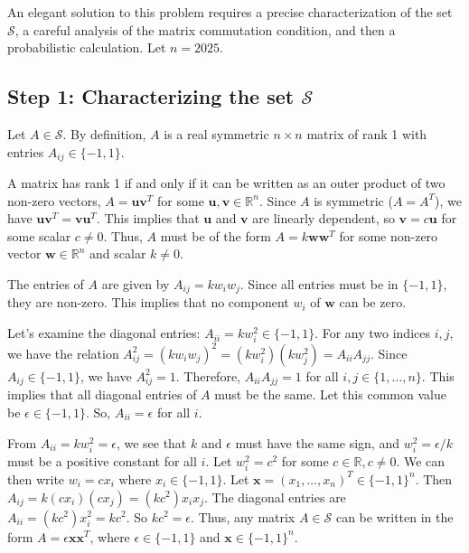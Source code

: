 \documentclass[12pt,a4paper]{article}
\theoremstyle{definition}
\begin{document}
        An elegant solution to this problem requires a precise characterization of the set $\mathcal{S}$, a careful analysis of the matrix commutation condition, and then a probabilistic calculation. Let $n = 2025$.

        \subsection*{Step 1: Characterizing the set $\mathcal{S}$}

        Let $A \in \mathcal{S}$. By definition, $A$ is a real symmetric $n \times n$ matrix of rank 1 with entries $A_{ij} \in \{-1, 1\}$.

        A matrix has rank 1 if and only if it can be written as an outer product of two non-zero vectors, $A = \mathbf{u}\mathbf{v}^T$ for some $\mathbf{u}, \mathbf{v} \in \mathbb{R}^n$. Since $A$ is symmetric ($A=A^T$), we have $\mathbf{u}\mathbf{v}^T = \mathbf{v}\mathbf{u}^T$. This implies that $\mathbf{u}$ and $\mathbf{v}$ are linearly dependent, so $\mathbf{v} = c\mathbf{u}$ for some scalar $c \neq 0$. Thus, $A$ must be of the form $A = k \mathbf{w}\mathbf{w}^T$ for some non-zero vector $\mathbf{w} \in \mathbb{R}^n$ and scalar $k \neq 0$.

        The entries of $A$ are given by $A_{ij} = k w_i w_j$. Since all entries must be in $\{-1, 1\}$, they are non-zero. This implies that no component $w_i$ of $\mathbf{w}$ can be zero.

        Let's examine the diagonal entries: $A_{ii} = k w_i^2 \in \{-1, 1\}$.
        For any two indices $i, j$, we have the relation $A_{ij}^2 = (k w_i w_j)^2 = (k w_i^2)(k w_j^2) = A_{ii} A_{jj}$.
        Since $A_{ij} \in \{-1, 1\}$, we have $A_{ij}^2 = 1$. Therefore, $A_{ii} A_{jj} = 1$ for all $i, j \in \{1, \dots, n\}$.
        This implies that all diagonal entries of $A$ must be the same. Let this common value be $\epsilon \in \{-1, 1\}$. So, $A_{ii} = \epsilon$ for all $i$.

        From $A_{ii} = k w_i^2 = \epsilon$, we see that $k$ and $\epsilon$ must have the same sign, and $w_i^2 = \epsilon/k$ must be a positive constant for all $i$. Let $w_i^2 = c^2$ for some $c \in \mathbb{R}, c \neq 0$. We can then write $w_i = c x_i$ where $x_i \in \{-1, 1\}$. Let $\mathbf{x} = (x_1, \dots, x_n)^T \in \{-1, 1\}^n$.
        Then $A_{ij} = k (c x_i)(c x_j) = (k c^2) x_i x_j$.
        The diagonal entries are $A_{ii} = (k c^2) x_i^2 = k c^2$. So $k c^2 = \epsilon$.
        Thus, any matrix $A \in \mathcal{S}$ can be written in the form $A = \epsilon \mathbf{x}\mathbf{x}^T$, where $\epsilon \in \{-1, 1\}$ and $\mathbf{x} \in \{-1, 1\}^n$.
\end{document}
